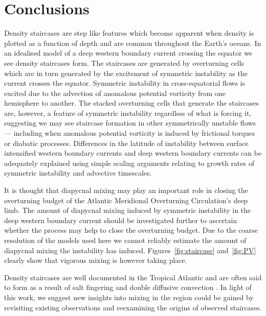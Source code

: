 \section{Conclusions}
\label{sec:conc}
Density staircases are step like features which become apparent when density is plotted as a function of depth and are common throughout the Earth's oceans. In an idealised model of a deep western boundary current crossing the equator we see density staircases form. The staircases are generated by overturning cells which are in turn generated by the excitement of symmetric instability as the current crosses the equator. Symmetric instability in cross-equatorial flows is excited due to the advection of anomalous potential vorticity from one hemisphere to another. The stacked overturning cells that generate the staircases are, however, a feature of symmetric instability regardless of what is forcing it, suggesting we may see staircase formation in other symmetrically unstable flows --- including when anomalous potential vorticity is induced by frictional torques or diabatic processes. Differences in the latitude of instability between surface intensified western boundary currents and deep western boundary currents can be adequately explained using simple scaling arguments relating to growth rates of symmetric instability and advective timescales.

It is thought that diapycnal mixing may play an important role in closing the overturning budget of the Atlantic Meridional Overturning Circulation's deep limb. The amount of diapycnal mixing induced by symmetric instability in the deep western boundary current should be investigated further to ascertain whether the process may help to close the overturning budget. Due to the coarse resolution of the models used here we cannot reliably estimate the amount of diapycnal mixing the instability has induced. Figures~\ref{fig:staircase} and~\ref{fig:PV} clearly show that vigorous mixing is however taking place.

Density staircases are well documented in the Tropical Atlantic and are often said to form as a result of salt fingering and double diffusive convection \citep[e.g.][]{Schmitt1987, Schmitt2005}. In light of this work, we suggest new insights into mixing in the region could be gained by revisiting existing observations and reexamining the origins of observed staircases.
